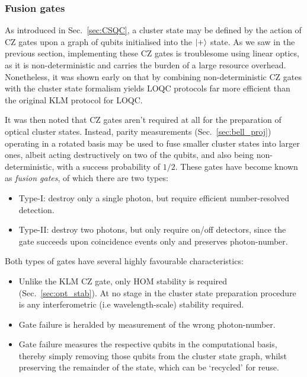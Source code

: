 %
%

\subsubsection{Fusion gates} 

As introduced in Sec.~\ref{sec:CSQC}, a cluster state may be defined by the action of CZ gates upon a graph of qubits initialised into the $|+\rangle$ state. As we saw in the previous section, implementing these CZ gates is troublesome using linear optics, as it is non-deterministic and carries the burden of a large resource overhead. Nonetheless, it was shown early on \cite{NielsenOptCS} that by combining non-deterministic CZ gates with the cluster state formalism yields LOQC protocols far more efficient than the original KLM protocol for LOQC.

It was then noted \cite{BrowneRudolph} that CZ gates aren't required at all for the preparation of optical cluster states. Instead, parity measurements (Sec.~\ref{sec:bell_proj}) operating in a rotated basis may be used to fuse smaller cluster states into larger ones, albeit acting destructively on two of the qubits, and also being non-deterministic, with a success probability of $1/2$. These gates have become known as \textit{fusion gates}, of which there are two types:
\begin{itemize}
	\item Type-I: destroy only a single photon, but require efficient number-resolved detection.
	\item Type-II: destroy two photons, but only require on/off detectors, since the gate succeeds upon coincidence events only and preserves photon-number.
\end{itemize}
Both types of gates have several highly favourable characteristics:
\begin{itemize}
	\item Unlike the KLM CZ gate, only HOM stability is required (Sec.~\ref{sec:opt_stab}). At no stage in the cluster state preparation procedure is any interferometric (i.e wavelength-scale) stability required.
	\item Gate failure is heralded by measurement of the wrong photon-number.
	\item Gate failure measures the respective qubits in the computational basis, thereby simply removing those qubits from the cluster state graph, whilst preserving the remainder of the state, which can be `recycled' for reuse.
\end{itemize}

